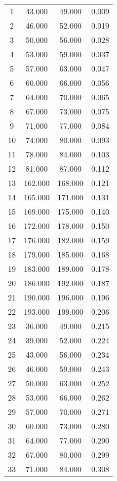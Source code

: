 % 
\begin{tabular}{cccc}
  \hline
  \hline
1 & 43.000 & 49.000 & 0.009 \\ 
  2 & 46.000 & 52.000 & 0.019 \\ 
  3 & 50.000 & 56.000 & 0.028 \\ 
  4 & 53.000 & 59.000 & 0.037 \\ 
  5 & 57.000 & 63.000 & 0.047 \\ 
  6 & 60.000 & 66.000 & 0.056 \\ 
  7 & 64.000 & 70.000 & 0.065 \\ 
  8 & 67.000 & 73.000 & 0.075 \\ 
  9 & 71.000 & 77.000 & 0.084 \\ 
  10 & 74.000 & 80.000 & 0.093 \\ 
  11 & 78.000 & 84.000 & 0.103 \\ 
  12 & 81.000 & 87.000 & 0.112 \\ 
  13 & 162.000 & 168.000 & 0.121 \\ 
  14 & 165.000 & 171.000 & 0.131 \\ 
  15 & 169.000 & 175.000 & 0.140 \\ 
  16 & 172.000 & 178.000 & 0.150 \\ 
  17 & 176.000 & 182.000 & 0.159 \\ 
  18 & 179.000 & 185.000 & 0.168 \\ 
  19 & 183.000 & 189.000 & 0.178 \\ 
  20 & 186.000 & 192.000 & 0.187 \\ 
  21 & 190.000 & 196.000 & 0.196 \\ 
  22 & 193.000 & 199.000 & 0.206 \\ 
  23 & 36.000 & 49.000 & 0.215 \\ 
  24 & 39.000 & 52.000 & 0.224 \\ 
  25 & 43.000 & 56.000 & 0.234 \\ 
  26 & 46.000 & 59.000 & 0.243 \\ 
  27 & 50.000 & 63.000 & 0.252 \\ 
  28 & 53.000 & 66.000 & 0.262 \\ 
  29 & 57.000 & 70.000 & 0.271 \\ 
  30 & 60.000 & 73.000 & 0.280 \\ 
  31 & 64.000 & 77.000 & 0.290 \\ 
  32 & 67.000 & 80.000 & 0.299 \\ 
  33 & 71.000 & 84.000 & 0.308 \\ 

\end{tabular}
